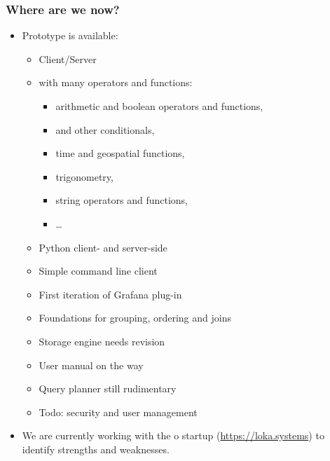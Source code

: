 \documentclass[mathserif]{beamer}
\begin{document}
\begin{frame}[shrink]
\frametitle{Where are we now?}
\begin{itemize}
\item Prototype is available:
      \bgroup
      \begin{itemize}
      \item Client/Server
      \item {} with many operators and functions:
            \begin{itemize}
            \item arithmetic and boolean operators and functions,
            \item {} and other conditionals,
            \item time and geospatial functions,
            \item trigonometry,
            \item string operators and functions,
            \item \dots
            \end{itemize}
      \item Python client- and server-side
      \item Simple command line client
      \item First iteration of Grafana plug-in
      \item Foundations for grouping, ordering and joins
      \item Storage engine needs revision
      \item User manual on the way
      \item Query planner still rudimentary
      \item Todo: security and user management
      \end{itemize}
      \egroup
\item We are currently working with the o
      startup  (\url{https://loka.systems})
      to identify strengths and weaknesses.
\end{itemize}
\end{frame}
\end{document}
